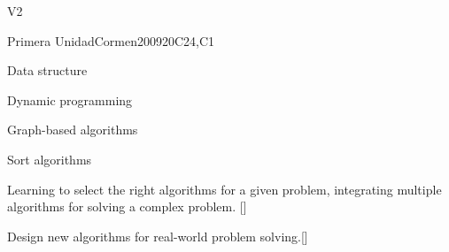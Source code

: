 \begin{syllabus}
\begin{competences}{V2}
    \item {}
    \item {}
    \item {}
\end{competences}

\begin{unit}{Primera Unidad}{}{Cormen2009}{20}{C24,C1}
\begin{topics}
        \item Data structure
        \item Dynamic programming
        \item Graph-based algorithms
        \item Sort algorithms
\end{topics}
\begin{learningoutcomes}
        \item Learning to select the right algorithms for a given problem, integrating multiple algorithms for solving a complex problem. [\Usage]
	\item Design new algorithms for real-world problem solving.[\Usage]
\end{learningoutcomes}
\end{unit}

\begin{coursebibliography}
\end{coursebibliography}

\end{syllabus}
